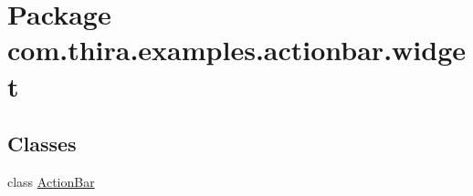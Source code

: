 \hypertarget{namespacecom_1_1thira_1_1examples_1_1actionbar_1_1widget}{\section{Package com.\-thira.\-examples.\-actionbar.\-widget}
\label{namespacecom_1_1thira_1_1examples_1_1actionbar_1_1widget}
}
\subsection*{Classes}
\begin{DoxyCompactItemize}
\item 
class \hyperlink{classcom_1_1thira_1_1examples_1_1actionbar_1_1widget_1_1_action_bar}{Action\-Bar}
\end{DoxyCompactItemize}

